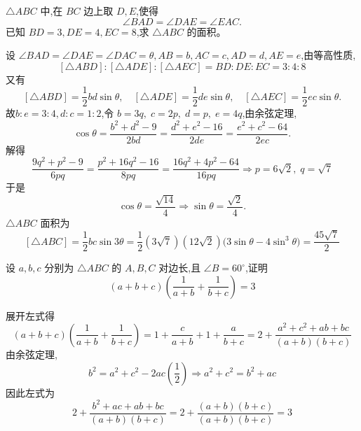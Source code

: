 \begin{questions}
    \question $\triangle ABC$ 中,在 $BC$ 边上取 $D,E$,使得  
    \[
    \angle BAD = \angle DAE = \angle EAC.
    \] 
    已知 $BD=3,DE=4,EC=8$,求 $\triangle ABC$ 的面积。
    \begin{solution}
        设 $\angle BAD = \angle DAE = \angle DAC = \theta, AB=b, AC=c, AD=d, AE=e$,由等高性质,
        \[
        [\triangle ABD] : [\triangle ADE] : [\triangle AEC] = BD : DE : EC = 3:4:8
        \]
        又有
        \[
        [\triangle ABD] = \frac12 bd \sin \theta, \quad 
        [\triangle ADE] = \frac12 de \sin \theta, \quad
        [\triangle AEC] = \frac12 ec \sin \theta.
        \]
        故$b:e = 3:4, d:c = 1:2$,令 $b = 3q,\; c = 2p, \; d = p, \; e = 4q$,由余弦定理,
        \[
        \cos \theta = \frac{b^2+d^2-9}{2bd} = \frac{d^2+e^2-16}{2de} = \frac{e^2+c^2-64}{2ec}.
        \]
        解得
        \[
        \frac{9q^2+p^2-9}{6pq} = \frac{p^2+16q^2-16}{8pq} = \frac{16q^2+4p^2-64}{16pq} \Rightarrow p=6\sqrt 2, \; q=\sqrt 7
        \]
        于是
        \[
        \cos \theta = \frac{\sqrt{14}}{4} \Rightarrow \sin \theta = \frac{\sqrt 2}{4}.
        \]
        $\triangle ABC$ 面积为
        \[
        [\triangle ABC] = \frac12 bc \sin 3\theta = \frac12 (3\sqrt 7)(12\sqrt 2) \bigl(3\sin \theta - 4\sin^3\theta \bigr) 
        = \frac{45\sqrt 7}{2} 
        \]
    \end{solution}

    \question 设 \(a,b,c\) 分别为 \(\triangle ABC\) 的 \(A, B, C\) 对边长,且 \(\angle B = 60^\circ\),证明
    \[
    (a+b+c)\left(\frac{1}{a+b}+\frac{1}{b+c}\right)=3
    \]
    \begin{solution}
        展开左式得
        \[
        (a+b+c)\left(\frac{1}{a+b} + \frac{1}{b+c}\right) = 1 + \frac{c}{a+b} + 1 + \frac{a}{b+c} = 2 + \frac{a^2 + c^2 + ab + bc}{(a+b)(b+c)}
        \]
        由余弦定理,
        \[
        b^2=a^2+c^2-2ac\left(\frac{1}{2}\right) \Rightarrow a^2 + c^2 = b^2 + ac 
        \]
        因此左式为 
        \[
        2 + \frac{b^2 + ac + ab + bc}{(a+b)(b+c)} = 2 + \frac{(a+b)(b+c)}{(a+b)(b+c)} = 3
        \]
    \end{solution}


\end{questions}
